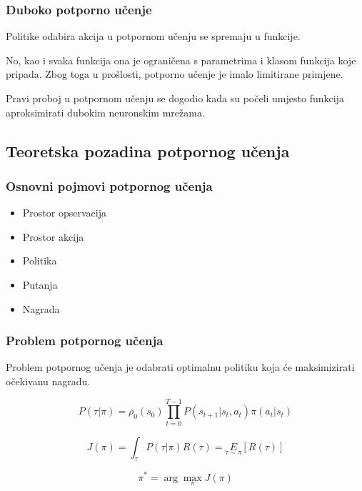 \documentclass{beamer}
\begin{document}
\begin{frame}
	\frametitle{Duboko potporno učenje}
	Politike odabira akcija u potpornom učenju se spremaju u funkcije.
	\bigskip

	No, kao i svaka funkcija ona je ograničena s parametrima i klasom funkcija koje pripada. Zbog toga u prošlosti, potporno učenje je imalo limitirane primjene.
	\bigskip

	Pravi proboj u potpornom učenju se dogodio kada su počeli umjesto funkcija aproksimirati dubokim neuronskim mrežama.

\end{frame}


\subsection{Teoretska pozadina potpornog učenja}

\begin{frame}
	\frametitle{Osnovni pojmovi potpornog učenja}

	\begin{itemize}
		\item Prostor opservacija
		\item Prostor akcija
		\item Politika
		\item Putanja
		\item Nagrada
	\end{itemize}

\end{frame}

\begin{frame}
	\frametitle{Problem potpornog učenja}

	Problem potpornog učenja je odabrati optimalnu politiku koja će maksimizirati očekivanu nagradu.
	\bigskip

	\begin{equation}
		\label{probability trajectory}
		P(\tau|\pi) = \rho_0 (s_0) \prod_{t=0}^{T-1} P(s_{t+1} | s_t, a_t) \pi(a_t | s_t)
	\end{equation}

	\begin{equation}
		\label{ukupna nagrada}
		J(\pi) = \int_{\tau} P(\tau|\pi) R(\tau) = \underset{\tau\sim \pi} E[{R(\tau)}]
	\end{equation}

	\begin{equation}
		\label{optimizacijski problem}
		\pi^* = \arg \max_{\pi} J(\pi)
	\end{equation}

\end{frame}
\end{document}
